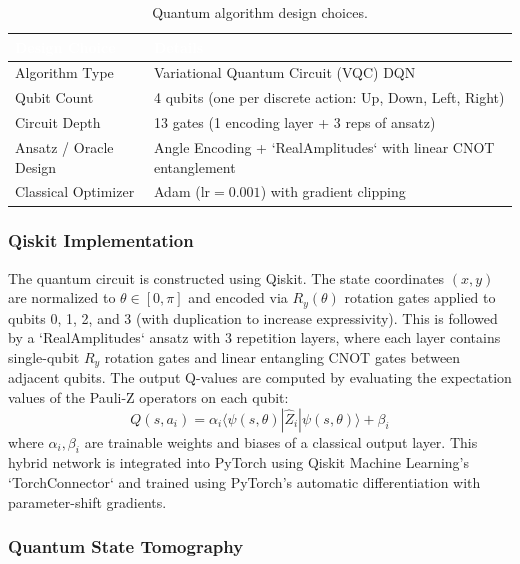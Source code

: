\documentclass[12pt, a4paper]{article}
\begin{document}
\begin{table}[H]
    \centering
    \caption{Quantum algorithm design choices.}
    \label{tab:quantum_design}
    \renewcommand{\arraystretch}{1.3}
    \begin{tabularx}{\textwidth}{|L{5.5cm}|X|}
        \hline
        \textcolor{white}{\textbf{Design Choice}} & \textcolor{white}{\textbf{Details}} \\
        \hline
        Algorithm Type & Variational Quantum Circuit (VQC) DQN \\
        \hline
        Qubit Count & 4 qubits (one per discrete action: Up, Down, Left, Right) \\
        \hline
        Circuit Depth & 13 gates (1 encoding layer + 3 reps of ansatz) \\
        \hline
        Ansatz / Oracle Design & Angle Encoding + `RealAmplitudes` with linear CNOT entanglement \\
        \hline
        Classical Optimizer & Adam ($\text{lr} = 0.001$) with gradient clipping \\
        \hline
    \end{tabularx}
\end{table}

\subsubsection{Qiskit Implementation}

The quantum circuit is constructed using Qiskit. The state coordinates $(x, y)$ are normalized to $\theta \in [0, \pi]$ and encoded via $R_y(\theta)$ rotation gates applied to qubits 0, 1, 2, and 3 (with duplication to increase expressivity). This is followed by a `RealAmplitudes` ansatz with 3 repetition layers, where each layer contains single-qubit $R_y$ rotation gates and linear entangling CNOT gates between adjacent qubits.
The output Q-values are computed by evaluating the expectation values of the Pauli-Z operators on each qubit:
\[ Q(s, a_i) = \alpha_i \langle \psi(s, \theta) | \hat{Z}_i | \psi(s, \theta) \rangle + \beta_i \]
where $\alpha_i, \beta_i$ are trainable weights and biases of a classical output layer. This hybrid network is integrated into PyTorch using Qiskit Machine Learning's `TorchConnector` and trained using PyTorch's automatic differentiation with parameter-shift gradients.

\subsubsection{Quantum State Tomography}
\end{document}
